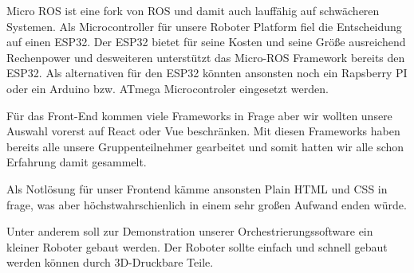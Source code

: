 \begin{flushleft}
    Micro ROS ist eine fork von ROS und damit auch lauffähig auf schwächeren Systemen.
    Als Microcontroller für unsere Roboter Platform fiel die Entscheidung auf einen ESP32.
    Der ESP32 bietet für seine Kosten und seine Größe ausreichend Rechenpower und
    desweiteren unterstützt das Micro-ROS Framework bereits den ESP32.
    Als alternativen für den ESP32 könnten ansonsten noch ein Rapsberry PI oder ein Arduino
    bzw. ATmega Microcontroler eingesetzt werden.

    Für das Front-End kommen viele Frameworks in Frage aber wir wollten unsere Auswahl vorerst auf React oder Vue beschränken.
    Mit diesen Frameworks haben bereits alle unsere Gruppenteilnehmer gearbeitet und somit hatten wir
    alle schon Erfahrung damit gesammelt.

    Als Notlösung für unser Frontend kämme ansonsten Plain HTML und CSS in frage, was aber höchstwahrschienlich
    in einem sehr großen Aufwand enden würde.

    Unter anderem soll zur Demonstration unserer Orchestrierungssoftware ein kleiner Roboter gebaut werden.
    Der Roboter sollte einfach und schnell gebaut werden können durch 3D-Druckbare Teile.
\end{flushleft}